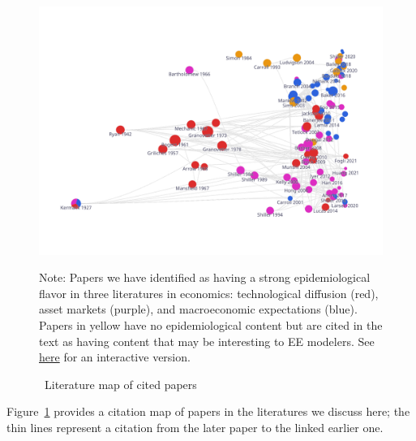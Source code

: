 \begin{figure}[!ht] \centering  %
  \caption{ ~Literature map of cited papers}
  \label{fig:graph_mixer}
  \centerline{\includegraphics[width=\textwidth]{./figures/graph_mixer}}
  \begin{flushleft}
    {\footnotesize Note: Papers we have identified as having a strong epidemiological flavor in three literatures in economics: technological diffusion (red), asset markets (purple), and macroeconomic expectations (blue).  Papers in yellow have no epidemiological content but are cited in the text as having content that may be interesting to EE modelers. See \href{https://app.litmaps.co/shared/89EF6E28-98E7-4406-AA0F-BE8045A0571C}{here} for an interactive version.}  %
  \end{flushleft}
\end{figure}

Figure~\ref{fig:graph_mixer} provides a citation map of papers in the literatures we discuss here; the thin lines represent a citation from the later paper to the linked earlier one.

